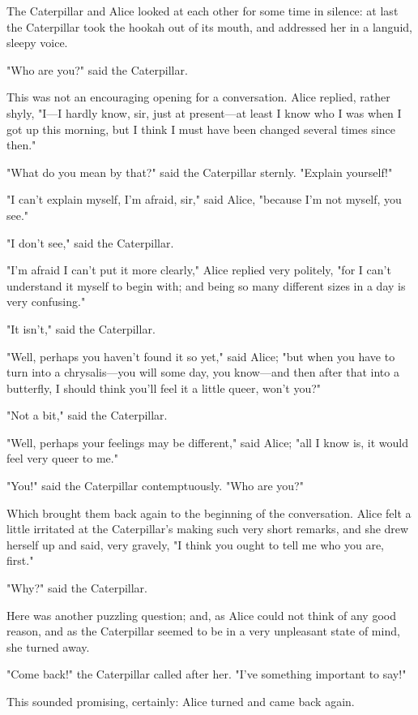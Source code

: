 The Caterpillar and Alice looked at each other for some time in silence: at last the Caterpillar took the hookah out of its mouth, and addressed her in a languid, sleepy voice.

​"Who are you?" said the Caterpillar.

This was not an encouraging opening for a conversation. Alice replied, rather shyly, "I—I hardly know, sir, just at present—at least I know who I was when I got up this morning, but I think I must have been changed several times since then."

"What do you mean by that?" said the Caterpillar sternly. "Explain yourself!"

"I can't explain myself, I'm afraid, sir," said Alice, "because I'm not myself, you see."

"I don't see," said the Caterpillar.

"I'm afraid I can't put it more clearly," Alice replied very politely, "for I can't understand it myself to begin with; and being so many different sizes in a day is very confusing."

"It isn't," said the Caterpillar.

"Well, perhaps you haven't found it so yet," said Alice; "but when you have to turn into a chrysalis—you will some day, you know—and then after that into a butterfly, I should think you'll feel it a little queer, won't you?"

​"Not a bit," said the Caterpillar.

"Well, perhaps your feelings may be different," said Alice; "all I know is, it would feel very queer to me."

"You!" said the Caterpillar contemptuously. "Who are you?"

Which brought them back again to the beginning of the conversation. Alice felt a little irritated at the Caterpillar's making such very short remarks, and she drew herself up and said, very gravely, "I think you ought to tell me who you are, first."

"Why?" said the Caterpillar.

Here was another puzzling question; and, as Alice could not think of any good reason, and as the Caterpillar seemed to be in a very unpleasant state of mind, she turned away.

"Come back!" the Caterpillar called after her. "I've something important to say!"

This sounded promising, certainly: Alice turned and came back again.

